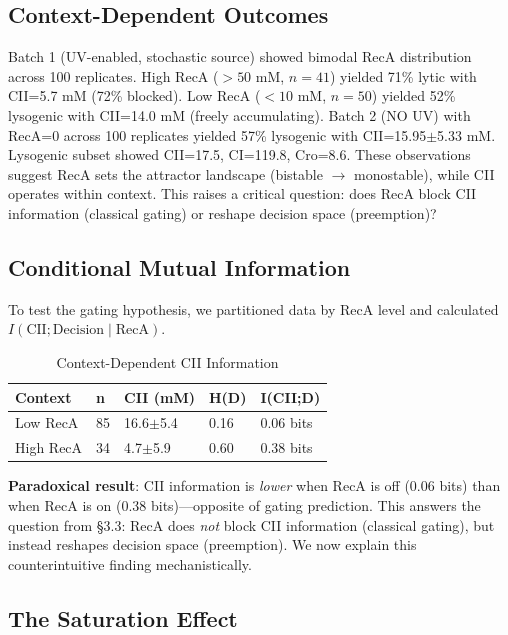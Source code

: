\documentclass[10pt,twocolumn]{article}
\begin{document}
\subsection{Context-Dependent Outcomes}

Batch 1 (UV-enabled, stochastic source) showed bimodal RecA distribution across 100 replicates. High RecA ($>50$ mM, $n=41$) yielded 71\% lytic with CII=5.7 mM (72\% blocked). Low RecA ($<10$ mM, $n=50$) yielded 52\% lysogenic with CII=14.0 mM (freely accumulating). Batch 2 (NO UV) with RecA=0 across 100 replicates yielded 57\% lysogenic with CII=15.95$\pm$5.33 mM. Lysogenic subset showed CII=17.5, CI=119.8, Cro=8.6. These observations suggest RecA sets the attractor landscape (bistable $\rightarrow$ monostable), while CII operates within context. This raises a critical question: does RecA block CII information (classical gating) or reshape decision space (preemption)?

\subsection{Conditional Mutual Information}

To test the gating hypothesis, we partitioned data by RecA level and calculated $I(\text{CII}; \text{Decision} \mid \text{RecA})$.

\begin{table}[h]
\centering
\caption{Context-Dependent CII Information}
\begin{tabular}{@{}lllll@{}}
\toprule
\textbf{Context} & \textbf{n} & \textbf{CII (mM)} & \textbf{H(D)} & \textbf{I(CII;D)} \\
\midrule
Low RecA & 85 & 16.6$\pm$5.4 & 0.16 & 0.06 bits \\
High RecA & 34 & 4.7$\pm$5.9 & 0.60 & 0.38 bits \\
\bottomrule
\end{tabular}
\end{table}

\textbf{Paradoxical result}: CII information is \textit{lower} when RecA is off (0.06 bits) than when RecA is on (0.38 bits)—opposite of gating prediction. This answers the question from §3.3: RecA does \textit{not} block CII information (classical gating), but instead reshapes decision space (preemption). We now explain this counterintuitive finding mechanistically.

\subsection{The Saturation Effect}
\end{document}
